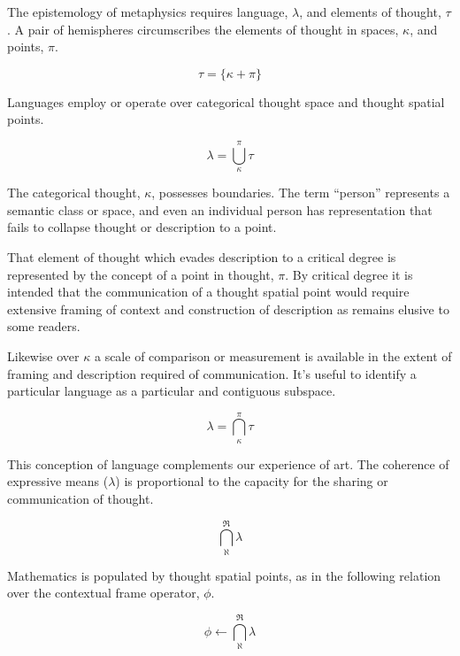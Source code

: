 

{\global\let\reviews = \rightleftharpoons}
{\global\let\accepts = \leftarrow}
{\global\let\rejects = \rightarrow}
{\global\let\rellang         = \lambda}
{\global\let\relouter        = \Re}
{\global\let\relinner        = \aleph}
{\global\let\relterm         = \tau}
{\global\let\termclass       = \kappa}
{\global\let\termpoint       = \pi}
{\global\let\termouter       = \alpha}
{\global\let\terminner       = \beta}

The epistemology of metaphysics requires language, $\rellang$, and
elements of thought, $\relterm$.  A pair of hemispheres circumscribes
the elements of thought in spaces, $\termclass$, and points,
$\termpoint$.

$$
 \relterm = \{ \termclass + \termpoint \}
$$

Languages employ or operate over categorical thought space and thought
spatial points.

$$
 \rellang = \bigcup_{\termclass}^{\termpoint} \relterm
$$

The categorical thought, $\termclass$, possesses boundaries.  The term
``person'' represents a semantic class or space, and even an
individual person has representation that fails to collapse thought or
description to a point.

That element of thought which evades description to a critical degree
is represented by the concept of a point in thought, $\termpoint$.  By
critical degree it is intended that the communication of a thought
spatial point would require extensive framing of context and
construction of description as remains elusive to some readers.

Likewise over $\termclass$ a scale of comparison or measurement is
available in the extent of framing and description required of
communication.  It's useful to identify a particular language as a
particular and contiguous subspace.

$$
 \rellang = \bigcap_{\termclass}^{\termpoint} \relterm 
$$

This conception of language complements our experience of art.  The
coherence of expressive means ($\rellang$) is proportional to the
capacity for the sharing or communication of thought.

$$
 \bigcap_{\relinner}^{\relouter} \rellang
$$

Mathematics is populated by thought spatial points, as in the
following relation over the contextual frame operator, $\phi$.

$$
 \phi \accepts \bigcap_{\relinner}^{\relouter} \rellang
$$

